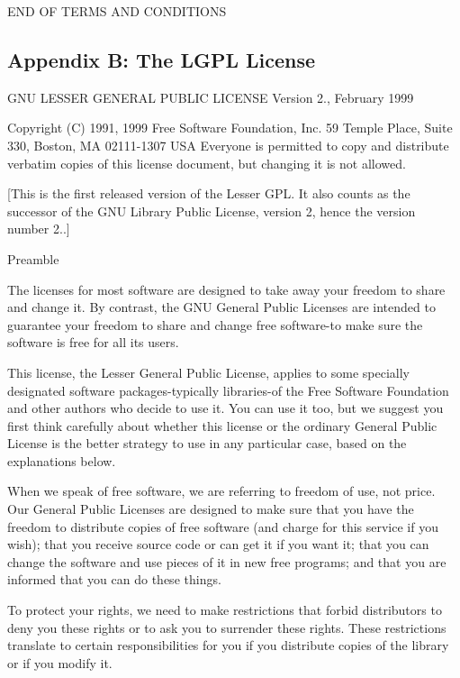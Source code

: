 E\-N\-D O\-F T\-E\-R\-M\-S A\-N\-D C\-O\-N\-D\-I\-T\-I\-O\-N\-S

\subsection*{Appendix B\-: The L\-G\-P\-L License }

G\-N\-U L\-E\-S\-S\-E\-R G\-E\-N\-E\-R\-A\-L P\-U\-B\-L\-I\-C L\-I\-C\-E\-N\-S\-E Version 2., February 1999

Copyright (C) 1991, 1999 Free Software Foundation, Inc. 59 Temple Place, Suite 330, Boston, M\-A 02111-\/1307 U\-S\-A Everyone is permitted to copy and distribute verbatim copies of this license document, but changing it is not allowed.

\mbox{[}This is the first released version of the Lesser G\-P\-L. It also counts as the successor of the G\-N\-U Library Public License, version 2, hence the version number 2..\mbox{]}

Preamble

The licenses for most software are designed to take away your freedom to share and change it. By contrast, the G\-N\-U General Public Licenses are intended to guarantee your freedom to share and change free software-\/to make sure the software is free for all its users.

This license, the Lesser General Public License, applies to some specially designated software packages-\/typically libraries-\/of the Free Software Foundation and other authors who decide to use it. You can use it too, but we suggest you first think carefully about whether this license or the ordinary General Public License is the better strategy to use in any particular case, based on the explanations below.

When we speak of free software, we are referring to freedom of use, not price. Our General Public Licenses are designed to make sure that you have the freedom to distribute copies of free software (and charge for this service if you wish); that you receive source code or can get it if you want it; that you can change the software and use pieces of it in new free programs; and that you are informed that you can do these things.

To protect your rights, we need to make restrictions that forbid distributors to deny you these rights or to ask you to surrender these rights. These restrictions translate to certain responsibilities for you if you distribute copies of the library or if you modify it.

